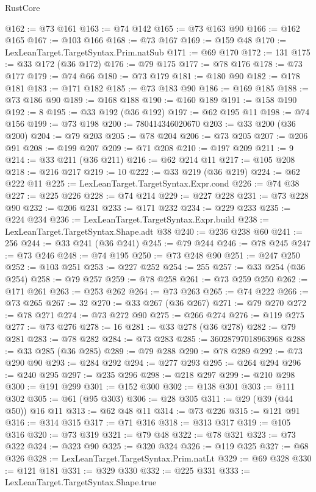 \begin{lexlean}{RustCore}
\begin{coremodule}
@162 := @73 @161
@163 := @74 @142
@165 := @73 @163 @90
@166 := @162 @165
@167 := @103 @166
@168 := @73 @167
@169 := @159 @48
@170 := LexLeanTarget.TargetSyntax.Prim.natSub
@171 := @69 @170
@172 := 131
@175 := @33 @172 (@36 @172)
@176 := @79 @175
@177 := @78 @176
@178 := @73 @177
@179 := @74 @66
@180 := @73 @179
@181 := @180 @90
@182 := @178 @181
@183 := @171 @182
@185 := @73 @183 @90
@186 := @169 @185
@188 := @73 @186 @90
@189 := @168 @188
@190 := @160 @189
@191 := @158 @190
@192 := 8
@195 := @33 @192 (@36 @192)
@197 := @62 @195 @11
@198 := @74 @156
@199 := @73 @198
@200 := 780414346020670
@203 := @33 @200 (@36 @200)
@204 := @79 @203
@205 := @78 @204
@206 := @73 @205
@207 := @206 @91
@208 := @199 @207
@209 := @71 @208
@210 := @197 @209
@211 := 9
@214 := @33 @211 (@36 @211)
@216 := @62 @214 @11
@217 := @105 @208
@218 := @216 @217
@219 := 10
@222 := @33 @219 (@36 @219)
@224 := @62 @222 @11
@225 := LexLeanTarget.TargetSyntax.Expr.cond
@226 := @74 @38
@227 := @225 @226
@228 := @74 @214
@229 := @227 @228
@231 := @73 @228 @90
@232 := @206 @231
@233 := @171 @232
@234 := @229 @233
@235 := @224 @234
@236 := LexLeanTarget.TargetSyntax.Expr.build
@238 := LexLeanTarget.TargetSyntax.Shape.adt @38
@240 := @236 @238 @60
@241 := 256
@244 := @33 @241 (@36 @241)
@245 := @79 @244
@246 := @78 @245
@247 := @73 @246
@248 := @74 @195
@250 := @73 @248 @90
@251 := @247 @250
@252 := @103 @251
@253 := @227 @252
@254 := 255
@257 := @33 @254 (@36 @254)
@258 := @79 @257
@259 := @78 @258
@261 := @73 @259 @250
@262 := @171 @261
@263 := @253 @262
@264 := @73 @263
@265 := @74 @222
@266 := @73 @265
@267 := 32
@270 := @33 @267 (@36 @267)
@271 := @79 @270
@272 := @78 @271
@274 := @73 @272 @90
@275 := @266 @274
@276 := @119 @275
@277 := @73 @276
@278 := 16
@281 := @33 @278 (@36 @278)
@282 := @79 @281
@283 := @78 @282
@284 := @73 @283
@285 := 36028797018963968
@288 := @33 @285 (@36 @285)
@289 := @79 @288
@290 := @78 @289
@292 := @73 @290 @90
@293 := @284 @292
@294 := @277 @293
@295 := @264 @294
@296 := @240 @295
@297 := @235 @296
@298 := @218 @297
@299 := @210 @298
@300 := @191 @299
@301 := @152 @300
@302 := @138 @301
@303 := @111 @302
@305 := @61 (@95 @303)
@306 := @28 @305
@311 := @29 (@39 (@44 @50)) @16 @11
@313 := @62 @48 @11
@314 := @73 @226
@315 := @121 @91
@316 := @314 @315
@317 := @71 @316
@318 := @313 @317
@319 := @105 @316
@320 := @73 @319
@321 := @79 @48
@322 := @78 @321
@323 := @73 @322
@324 := @323 @90
@325 := @320 @324
@326 := @119 @325
@327 := @68 @326
@328 := LexLeanTarget.TargetSyntax.Prim.natLt
@329 := @69 @328
@330 := @121 @181
@331 := @329 @330
@332 := @225 @331
@333 := LexLeanTarget.TargetSyntax.Shape.true

\end{coremodule}
\end{lexlean}
